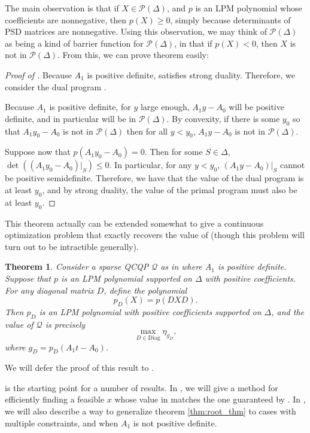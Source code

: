 \documentclass{amsart}
\newtheorem{theorem}{Theorem}[section]
\theoremstyle{definition}
\renewcommand{\P}{\mathcal{P}}
\begin{document}
The main observation is that if $X \in \P(\Delta)$, and $p$ is an LPM polynomial whose coefficients are nonnegative, then $p(X) \ge 0$, simply because determinants of PSD matrices are nonnegative.
Using this observation, we may think of $\P(\Delta)$ as being a kind of barrier function for $\P(\Delta)$, in that if $p(X) < 0$, then $X$ is not in $\P(\Delta)$.
From this, we can prove  theorem easily:
\begin{proof}[Proof of ]
    Because $A_1$ is positive definite,  satisfies strong duality. Therefore, we consider the dual program .

    Because $A_1$ is positive definite, for $y$ large enough, $A_1 y - A_0$ will be positive definite, and in particular will be in $\mathcal{P}(\Delta)$.
    By convexity, if there is some $y_0$ so that $A_1 y_0 - A_0$ is not in $\mathcal{P}(\Delta)$ then for all $y < y_0$, $A_1 y - A_0$ is not in $\mathcal{P}(\Delta)$.

    Suppose now that $p(A_1y_0 - A_0) = 0$. Then for some $S \in \Delta$, $\det((A_1y_0 - A_0)|_S) \le 0$.
    In particular, for any $y < y_0$, $(A_1 y - A_0)|_S$ cannot be positive semidefinite.
    Therefore, we have that the value of the dual program is at least $y_0$, and by strong duality, the value of the primal program must also be at least $y_0$.
\end{proof}

This theorem actually can be extended somewhat to give a continuous optimization problem that exactly recovers the value of  (though this problem will turn out to be intractible generally).
\begin{theorem}
    \label{thm:continuous_formulation}
    Consider a sparse QCQP $\mathcal{Q}$ as in  where $A_1$ is positive definite.
    Suppose that $p$ is an LPM polynomial supported on $\Delta$ with positive coefficients. For any diagonal matrix $D$, define the polynomial
    \[
        p_D(X) = p(DXD).
    \]
    Then $p_D$ is an LPM polynomial with positive coefficients supported on $\Delta$, and the value of $\mathcal{Q}$ is precisely
    \[
        \max_{D \in \text{Diag}} \eta_{g_D},
    \]
    where $g_D = p_D(A_1t - A_0)$.
\end{theorem}
We will defer the proof of this result to .

 is the starting point for a number of results.
In , we will give a method for efficiently finding a feasible $x$ whose value in  matches the one guaranteed by .
In , we will also describe a way to generalize theorem \ref{thm:root_thm} to cases with multiple constraints, and when $A_1$ is not positive definite.
\end{document}
